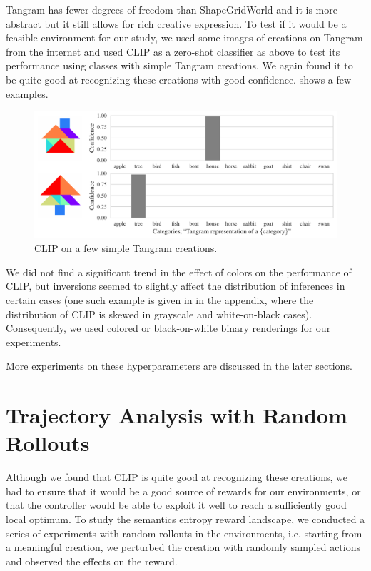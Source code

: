 Tangram has fewer degrees of freedom than ShapeGridWorld and it is more abstract but it still allows for rich creative expression.
To test if it would be a feasible environment for our study, we used some images of creations on Tangram from the internet and used CLIP as a zero-shot classifier as above to test its performance using classes with simple Tangram creations.
We again found it to be quite good at recognizing these creations with good confidence.
 shows a few examples.
\begin{figure}[h]
    \centering
    \includegraphics[width=\textwidth]{images/tangram_comparison_10.pdf}
    \caption{CLIP on a few simple Tangram creations.}
    \label{fig:clip-tangram}
\end{figure}

We did not find a significant trend in the effect of colors on the performance of CLIP, but inversions seemed to slightly affect the distribution of inferences in certain cases
(one such example is given in  in the appendix, where the distribution of CLIP is skewed in grayscale and white-on-black cases).
Consequently, we used colored or black-on-white binary renderings for our experiments.

More experiments on these hyperparameters are discussed in the later sections.


\section{Trajectory Analysis with Random Rollouts}
\label{sec:clip-problems}
Although we found that CLIP is quite good at recognizing these creations, we had to ensure that it would be a good source of rewards for our environments, or that the controller would be able to exploit it well to reach a sufficiently good local optimum.
To study the semantics entropy reward landscape, we conducted a series of experiments with random rollouts in the environments, i.e. starting from a meaningful creation, we perturbed the creation with randomly sampled actions and observed the effects on the reward.

